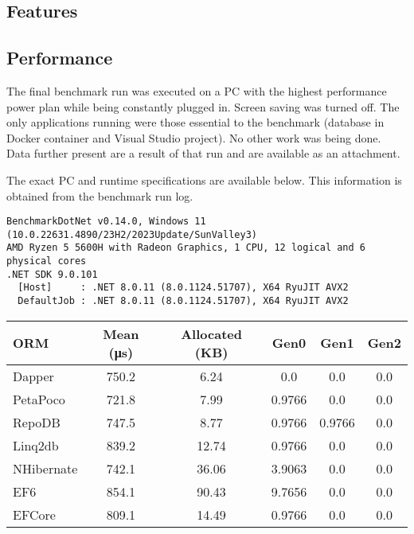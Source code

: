 \subsection{Features}

\subsection{Performance}
The final benchmark run was executed on a PC with the highest performance power plan while being constantly plugged in. Screen saving was turned off. The only applications running were those essential to the benchmark (database in Docker container and Visual Studio project). No other work was being done. Data further present are a result of that run and are available as an attachment.

The exact PC and runtime specifications are available below. This information is obtained from the benchmark run log. 
\begin{lstlisting}
BenchmarkDotNet v0.14.0, Windows 11 (10.0.22631.4890/23H2/2023Update/SunValley3)
AMD Ryzen 5 5600H with Radeon Graphics, 1 CPU, 12 logical and 6 physical cores
.NET SDK 9.0.101
  [Host]     : .NET 8.0.11 (8.0.1124.51707), X64 RyuJIT AVX2
  DefaultJob : .NET 8.0.11 (8.0.1124.51707), X64 RyuJIT AVX2
\end{lstlisting}

\begin{center}
    \begin{tabular}{l S S S S S}
        \hline
        ORM & {Mean (\si{\micro\second})} & {Allocated (KB)} & {Gen0} & {Gen1} & {Gen2} \\
        \hline
        Dapper    & 750.2  & 6.24  & 0.0    & 0.0    & 0.0    \\
        PetaPoco  & 721.8  & 7.99  & 0.9766 & 0.0    & 0.0    \\
        RepoDB    & 747.5  & 8.77  & 0.9766 & 0.9766 & 0.0    \\
        Linq2db   & 839.2  & 12.74 & 0.9766 & 0.0    & 0.0    \\
        NHibernate & 742.1 & 36.06 & 3.9063 & 0.0    & 0.0    \\
        EF6       & 854.1  & 90.43 & 9.7656 & 0.0    & 0.0    \\
        EFCore    & 809.1  & 14.49 & 0.9766 & 0.0    & 0.0    \\
        \hline
    \end{tabular}
\end{center}


